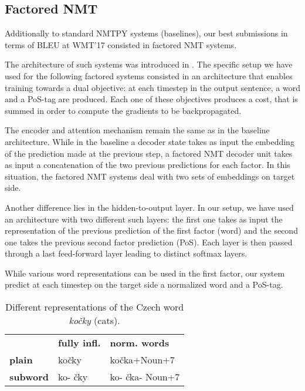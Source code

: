 \documentclass[11pt,letterpaper,final]{article}
\begin{document}

\subsection{Factored NMT}
\label{subsec:fnmt}

Additionally to standard NMTPY systems (baselines),
our best submissions in terms of BLEU at WMT'17
consisted in factored NMT systems.

The architecture of such systems was introduced
in \cite{Garcia16iwslt}. The specific setup we
have used for the following factored systems
consisted in an architecture that enables training
towards a dual objective: at each timestep in the
output sentence, a word and a PoS-tag are produced.
Each one of these objectives produces a cost, that
is summed in order to compute the gradients to
be backpropagated.

The encoder and attention mechanism remain the same
as in the baseline architecture. While in the baseline
a decoder state takes as input the embedding of the
prediction made at the previous step, a factored NMT
decoder unit takes as input a concatenation of the
two previous predictions for each factor.
In this situation, the factored NMT systems deal with
two sets of embeddings on target side.

Another difference lies in the hidden-to-output
layer. In our setup, we have used an architecture
with two different such layers: the first one takes
as input the representation of the previous prediction of the first factor
(word) and the second one takes the previous second factor prediction (PoS).
Each layer is then passed through a last feed-forward
layer leading to distinct softmax layers.

While various word representations \cite{burlot16fnmt} can be used in the
first factor, our system 
predict at each timestep on the target side a 
normalized word and a PoS-tag.

\begin{table}[!htbp]
\begin{center}
\begin{tabular}{ lll } 
\hline
& \textbf{fully infl.} & \textbf{norm. words} \\
\textbf{plain} & ko\v{c}ky & ko\v{c}ka+Noun+7 \\
\textbf{subword} & ko- \v{c}ky & ko- \v{c}ka- Noun+7 \\
\hline
 \end{tabular} 
\caption{\label{tab:word_repr} Different representations of the Czech word {\it ko\v{c}ky} (cats).}
\end{center}
\end{table}
\end{document}
